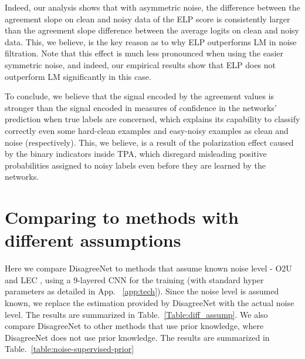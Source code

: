 \documentclass{article}
\begin{document}
\begin{figure}[h]
    \label{fig:uri}
\end{figure}

Indeed, our analysis shows that with asymmetric noise, the difference between the agreement slope on clean and noisy data of the ELP score is consistently larger than the agreement slope difference between the average logits on clean and noisy data. This, we believe, is the key reason as to why ELP outperforms LM in noise filtration. Note that this effect is much less pronounced when using the easier symmetric noise, and indeed, our empirical results show that ELP does not outperform LM significantly in this case.

To conclude, we believe that the signal encoded by the agreement values is stronger than the signal encoded in measures of confidence in the networks' prediction when true labels are concerned, which explains its capability to classify correctly even some hard-clean examples and easy-noisy examples as clean and noise (respectively). This, we believe, is a result of the polarization effect caused by the binary indicators inside TPA, which disregard misleading positive probabilities assigned to noisy labels even before they are learned by the networks.


\section{Comparing to methods with different assumptions}
\label{app:diff_assump}

Here we compare DisagreeNet to methods that assume known noise level - O2U \citep{o2u} and LEC \citep{lec}, using a 9-layered CNN for the training (with standard hyper parameters as detailed in App. ~\ref{app:tech}). Since the noise level is assumed known, we replace the estimation provided by DisagreeNet with the actual noise level. The results are summarized in Table.~\ref{Table:diff_assump}. We also compare DisagreeNet to other methods that use prior knowledge, where DisagreeNet does not use prior knowledge. The results are summarized in Table.~\ref{table:noise-supervised-prior}   
\end{document}
